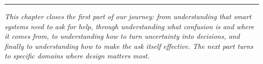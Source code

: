 \bigskip
\begin{center}
\rule{0.5\textwidth}{0.4pt}
\end{center}
\bigskip

\noindent\textit{This chapter closes the first part of our journey: from understanding that smart systems need to ask for help, through understanding what confusion is and where it comes from, to understanding how to turn uncertainty into decisions, and finally to understanding how to make the ask itself effective. The next part turns to specific domains where \hitl design matters most.}
